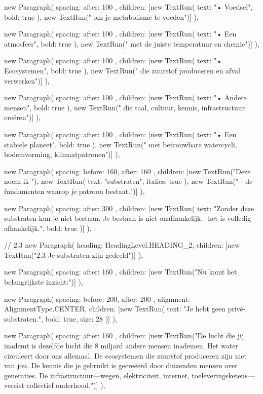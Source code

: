 {{      new Paragraph({
        spacing: { after: 100 },
        children: [new TextRun({ text: "• Voedsel", bold: true }), new TextRun(" om je metabolisme te voeden")]
      }),

      new Paragraph({
        spacing: { after: 100 },
        children: [new TextRun({ text: "• Een atmosfeer", bold: true }), new TextRun(" met de juiste temperatuur en chemie")]
      }),

      new Paragraph({
        spacing: { after: 100 },
        children: [new TextRun({ text: "• Ecosystemen", bold: true }), new TextRun(" die zuurstof produceren en afval verwerken")]
      }),

      new Paragraph({
        spacing: { after: 100 },
        children: [new TextRun({ text: "• Andere mensen", bold: true }), new TextRun(" die taal, cultuur, kennis, infrastructuur creëren")]
      }),

      new Paragraph({
        spacing: { after: 100 },
        children: [new TextRun({ text: "• Een stabiele planeet", bold: true }), new TextRun(" met betrouwbare watercycli, bodemvorming, klimaatpatronen")]
      }),

      new Paragraph({
        spacing: { before: 160, after: 160 },
        children: [new TextRun("Deze noem ik "), new TextRun({ text: "substraten", italics: true }), new TextRun("—de fundamenten waarop je patroon bestaat.")]
      }),

      new Paragraph({
        spacing: { after: 300 },
        children: [new TextRun({ text: "Zonder deze substraten kun je niet bestaan. Je bestaan is niet onafhankelijk—het is volledig afhankelijk.", bold: true })]
      }),

      // 2.3
      new Paragraph({
        heading: HeadingLevel.HEADING_2,
        children: [new TextRun("2.3 Je substraten zijn gedeeld")]
      }),

      new Paragraph({
        spacing: { after: 160 },
        children: [new TextRun("Nu komt het belangrijkste inzicht:")]
      }),

      new Paragraph({
        spacing: { before: 200, after: 200 },
        alignment: AlignmentType.CENTER,
        children: [new TextRun({ text: "Je hebt geen privé-substraten.", bold: true, size: 28 })]
      }),

      new Paragraph({
        spacing: { after: 160 },
        children: [new TextRun("De lucht die jij inademt is dezelfde lucht die 8 miljard andere mensen inademen. Het water circuleert door ons allemaal. De ecosystemen die zuurstof produceren zijn niet van jou. De kennis die je gebruikt is gecreëerd door duizenden mensen over generaties. De infrastructuur—wegen, elektriciteit, internet, toeleveringsketens—vereist collectief onderhoud.")]
      }),

}}
